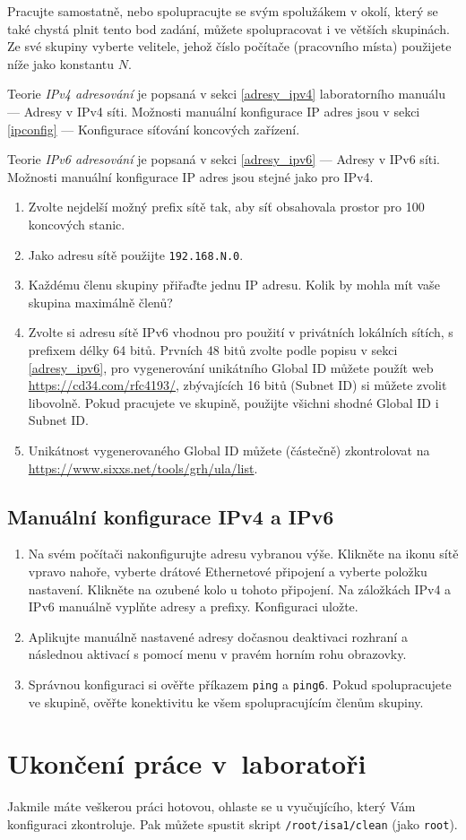 Pracujte samostatně, nebo spolupracujte se svým spolužákem v okolí, který se také
chystá plnit tento bod zadání, můžete spolupracovat i ve větších skupinách.
Ze své skupiny vyberte velitele, jehož číslo počítače (pracovního místa)
použijete níže jako konstantu $N$.

Teorie \emph{IPv4 adresování} je popsaná v sekci \ref{adresy_ipv4} laboratorního manuálu --- Adresy v IPv4 síti.
Možnosti manuální konfigurace IP adres jsou v sekci \ref{ipconfig} --- Konfigurace síťování koncových zařízení.

Teorie \emph{IPv6 adresování} je popsaná v sekci \ref{adresy_ipv6} --- Adresy v IPv6 síti.
Možnosti manuální konfigurace IP adres jsou stejné jako pro IPv4.

\begin{enumerate}
    \item Zvolte nejdelší možný prefix sítě tak, aby síť obsahovala prostor pro 100 koncových stanic.
    \item Jako adresu sítě použijte \texttt{192.168.N.0}.
    \item Každému členu skupiny přiřaďte jednu IP adresu. Kolik by mohla mít
      vaše skupina maximálně členů?
    \item Zvolte si adresu sítě IPv6 vhodnou pro použití v privátních lokálních
        sítích, s prefixem délky 64 bitů. Prvních 48 bitů zvolte podle popisu v
        sekci \ref{adresy_ipv6}, pro vygenerování unikátního Global ID můžete
        použít web \url{https://cd34.com/rfc4193/}, zbývajících 16 bitů (Subnet
        ID) si můžete zvolit libovolně. Pokud pracujete ve skupině, použijte
        všichni shodné Global ID i Subnet ID.
      \item Unikátnost vygenerovaného Global ID můžete (částečně)
        zkontrolovat na \url{https://www.sixxs.net/tools/grh/ula/list}.
\end{enumerate}

\subsection{Manuální konfigurace IPv4 a IPv6}

\begin{enumerate}
    \item Na svém počítači
      nakonfigurujte adresu vybranou výše. Klikněte na ikonu sítě vpravo nahoře,
      vyberte drátové Ethernetové připojení a vyberte položku nastavení.
      Klikněte na ozubené kolo u tohoto připojení. Na záložkách IPv4 a IPv6
      manuálně vyplňte adresy a prefixy. Konfiguraci uložte.
    \item Aplikujte manuálně nastavené adresy dočasnou deaktivaci rozhraní a
      následnou aktivací s pomocí menu v pravém horním rohu obrazovky.
    \item Správnou konfiguraci si ověřte příkazem {\tt ping} a {\tt ping6}. Pokud
      spolupracujete ve skupině, ověřte konektivitu ke všem spolupracujícím
      členům skupiny.
\end{enumerate}

\section{Ukončení práce v~laboratoři}
Jakmile máte veškerou práci hotovou, ohlaste se u vyučujícího, který Vám
konfiguraci zkontroluje. Pak můžete spustit skript {\tt /root/isa1/clean} (jako
\texttt{root}).
